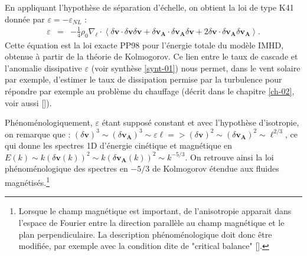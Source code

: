 En appliquant l'hypothèse de séparation d'échelle, on obtient la loi de type K41 donnée par $\varepsilon = - \varepsilon_{NL}$ : 
\begin{eqnarray}
\label{eq:turb_inc_ELK}     \varepsilon &=& - \frac{1}{4} \rho_0 \nabla_{\boldsymbol{\ell}} \cdot \left< \delta \boldsymbol{v} \cdot \delta \boldsymbol{v} \delta \boldsymbol{v} + \delta \boldsymbol{v_A} \cdot \delta \boldsymbol{v_A} \delta \boldsymbol{v} + 2 \delta \boldsymbol{v} \cdot \delta \boldsymbol{v_A} \delta \boldsymbol{v_A}\right> .
\end{eqnarray}
Cette équation est la loi exacte \acs{PP98} pour l'énergie totale du modèle \acs{IMHD}, obtenue à partir de la théorie de Kolmogorov. Ce lien entre le taux de cascade et l'anomalie dissipative $\varepsilon$ (voir synthèse \ref{synt-01}) nous permet, dans le vent solaire par exemple, d'estimer le taux de dissipation permise par la turbulence pour répondre par exemple au problème du chauffage (décrit dans le chapitre \ref{ch-02}, voir aussi [\cite{smith_dependence_2006,sorriso-valvo_observation_2007,stawarz_turbulent_2009,osman_proton_2013}]). 

Phénoménologiquement, $\varepsilon$ étant supposé constant et avec l'hypothèse d'isotropie, on remarque que : $(\delta \boldsymbol{v})^3 \sim (\delta \boldsymbol{v_A})^3 \sim \varepsilon \ell => (\delta \boldsymbol{v})^2 \sim (\delta \boldsymbol{v_A})^2 \sim \ell^{2/3}$, ce qui donne les spectres 1D d'énergie cinétique et magnétique en $E(k) \sim k(\delta \boldsymbol{v}(k))^2  \sim k(\delta \boldsymbol{v_A}(k))^2  \sim k^{-5/3}$. On retrouve ainsi la loi phénoménologique des spectres en $-5/3$ de Kolmogorov étendue aux fluides magnétisés.\footnote{Lorsque le champ magnétique est important, de l'anisotropie apparait dans l'espace de Fourier entre la direction parallèle au champ magnétique et le plan perpendiculaire. La description phénoménologique doit donc être modifiée, par exemple avec la condition dite de "critical balance" [\cite{goldreich_toward_1995,horbury_anisotropic_2008}].}

